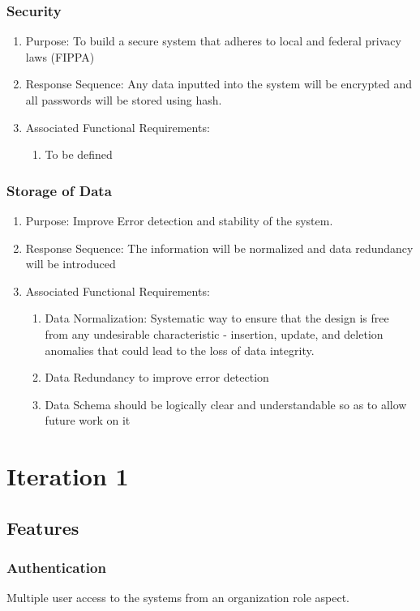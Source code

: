 \documentclass{journal}
\begin{document}
				\subsubsection{Security}
				\begin{enumerate}
\item Purpose: To build a secure system that adheres to local and federal privacy laws (FIPPA)
	\item Response Sequence: Any data inputted into the system will be encrypted and all passwords will be stored using hash.
	\item Associated Functional Requirements:
	\begin{enumerate}
	\item To be defined
	\end{enumerate}
	\end{enumerate}


	\subsubsection{Storage of Data}
	\begin{enumerate}
	\item Purpose: Improve Error detection and stability of the system.
	\item Response Sequence: The information will be normalized and data redundancy will be introduced
	\item Associated Functional Requirements:
	\begin{enumerate}
	\item Data Normalization: Systematic way to ensure that the design is free from any undesirable characteristic - insertion, update, and deletion anomalies that could lead to the loss of data integrity.
	\item Data Redundancy to improve error detection
	\item Data Schema should be logically clear and understandable so as to allow future work on it
	\end{enumerate}
	\end{enumerate}
	\newpage

	\section{Iteration 1}
	\subsection{Features}
	\subsubsection{Authentication}
	Multiple user access to the systems from an organization role aspect.
\end{document}

